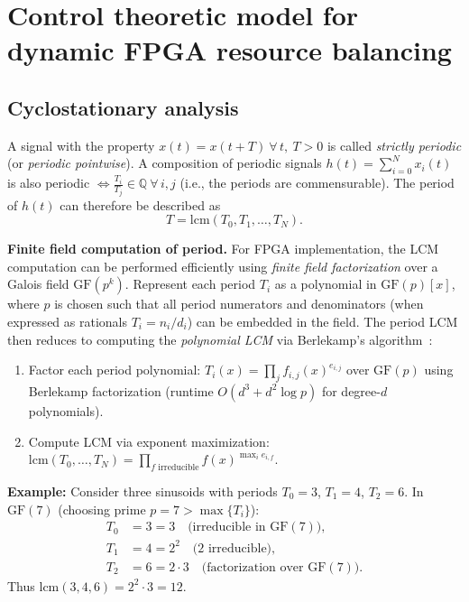 \chapter{Control theoretic model for dynamic FPGA resource balancing}

\section{Cyclostationary analysis}

A signal with the property $x(t) = x(t + T)\ \forall\, t,\ T>0$ is called \textit{strictly periodic} (or \textit{periodic pointwise}).
A composition of periodic signals $h(t) = \sum_{i=0}^N x_i(t)$ is also periodic $\iff \tfrac{T_i}{T_j} \in \mathbb{Q}\ \forall\, i,j$ (i.e., the periods are commensurable).
The period of $h(t)$ can therefore be described as
\[
T = \mathrm{lcm}(T_0, T_1, \dots, T_N).
\]

\noindent\textbf{Finite field computation of period.} For FPGA implementation, the LCM computation can be performed efficiently using \emph{finite field factorization} over a Galois field $\mathrm{GF}(p^k)$. Represent each period $T_i$ as a polynomial in $\mathrm{GF}(p)[x]$, where $p$ is chosen such that all period numerators and denominators (when expressed as rationals $T_i = n_i/d_i$) can be embedded in the field. The period LCM then reduces to computing the \emph{polynomial LCM} via Berlekamp's algorithm~\cite{berlekamp1970factoring,gathen2013modern}:
\begin{enumerate}
\item Factor each period polynomial: $T_i(x) = \prod_{j} f_{i,j}(x)^{e_{i,j}}$ over $\mathrm{GF}(p)$ using Berlekamp factorization (runtime $O(d^3 + d^2 \log p)$ for degree-$d$ polynomials).
\item Compute LCM via exponent maximization: $\mathrm{lcm}(T_0, \ldots, T_N) = \prod_{f \text{ irreducible}} f(x)^{\max_i e_{i,f}}$.
\end{enumerate}

\noindent\textbf{Example:} Consider three sinusoids with periods $T_0 = 3$, $T_1 = 4$, $T_2 = 6$. In $\mathrm{GF}(7)$ (choosing prime $p=7 > \max\{T_i\}$):
\begin{align}
T_0 &= 3 = 3 \quad \text{(irreducible in } \mathrm{GF}(7)\text{)}, \\
T_1 &= 4 = 2^2 \quad \text{(} 2 \text{ irreducible)}, \\
T_2 &= 6 = 2 \cdot 3 \quad \text{(factorization over } \mathrm{GF}(7)\text{)}.
\end{align}
Thus $\mathrm{lcm}(3, 4, 6) = 2^2 \cdot 3 = 12$.

